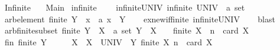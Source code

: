 %
\begin{isabellebody}%
%
%
\isadelimtheory
%
\endisadelimtheory
%
\isatagtheory
{}\isamarkupfalse%
\ Infinite\isanewline
\ \ \ Main\isanewline
{}%
\endisatagtheory
{\isafoldtheory}%
%
\isadelimtheory
\isanewline
%
\endisadelimtheory
\isanewline
{}\isamarkupfalse%
\ infinite\ {\isacharequal}{\kern0pt}\isanewline
\ \ \ infinite{\isacharunderscore}{\kern0pt}UNIV{\isacharcolon}{\kern0pt}\ {\isachardoublequoteopen}infinite\ {\isacharparenleft}{\kern0pt}UNIV\ {\isacharcolon}{\kern0pt}{\isacharcolon}{\kern0pt}\ {\isacharprime}{\kern0pt}a\ set{\isacharparenright}{\kern0pt}{\isachardoublequoteclose}\isanewline
{}\isanewline
\isanewline
{}\isamarkupfalse%
\ arb{\isacharunderscore}{\kern0pt}element{\isacharcolon}{\kern0pt}\ {\isachardoublequoteopen}finite\ Y\ {\isasymLongrightarrow}\ {\isasymexists}x\ {\isacharcolon}{\kern0pt}{\isacharcolon}{\kern0pt}\ {\isacharprime}{\kern0pt}a{\isachardot}{\kern0pt}\ x\ {\isasymnotin}\ Y{\isachardoublequoteclose}\isanewline
%
\isadelimproof
\ \ %
\endisadelimproof
%
\isatagproof
{}\isamarkupfalse%
\ ex{\isacharunderscore}{\kern0pt}new{\isacharunderscore}{\kern0pt}if{\isacharunderscore}{\kern0pt}finite\ infinite{\isacharunderscore}{\kern0pt}UNIV\isanewline
\ \ \isamarkupfalse%
\ blast%
\endisatagproof
{\isafoldproof}%
%
\isadelimproof
\isanewline
%
\endisadelimproof
\isanewline
{}\isamarkupfalse%
\ arb{\isacharunderscore}{\kern0pt}finite{\isacharunderscore}{\kern0pt}subset{\isacharcolon}{\kern0pt}\ {\isachardoublequoteopen}finite\ Y\ {\isasymLongrightarrow}\ {\isasymexists}X\ {\isacharcolon}{\kern0pt}{\isacharcolon}{\kern0pt}\ {\isacharprime}{\kern0pt}a\ set{\isachardot}{\kern0pt}\ Y\ {\isasyminter}\ X\ {\isacharequal}{\kern0pt}\ {\isacharbraceleft}{\kern0pt}{\isacharbraceright}{\kern0pt}\ {\isasymand}\ finite\ X\ {\isasymand}\ n\ {\isasymle}\ card\ X{\isachardoublequoteclose}\isanewline
%
\isadelimproof
%
\endisadelimproof
%
\isatagproof
{}\isamarkupfalse%
\ {\isacharminus}{\kern0pt}\isanewline
\ \ \isamarkupfalse%
\ fin{\isacharcolon}{\kern0pt}\ {\isachardoublequoteopen}finite\ Y{\isachardoublequoteclose}\isanewline
\ \ \isamarkupfalse%
\ \isamarkupfalse%
\ X\ \ {\isachardoublequoteopen}X\ {\isasymsubseteq}\ UNIV\ {\isacharminus}{\kern0pt}\ Y{\isachardoublequoteclose}\ {\isachardoublequoteopen}finite\ X{\isachardoublequoteclose}\ {\isachardoublequoteopen}n\ {\isasymle}\ card\ X{\isachardoublequoteclose}\isanewline

\end{isabellebody}
